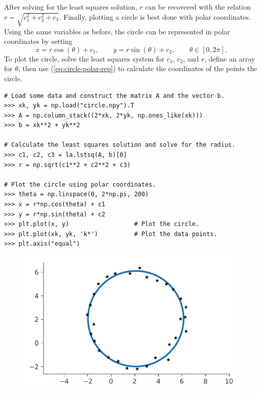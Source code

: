 After solving for the least squares solution, $r$ can be recovered with the relation $r = \sqrt{c_1^2 + c_2^2 + c_3}$.
Finally, plotting a circle is best done with polar coordinates.
Using the same variables as before, the circle can be represented in polar coordinates by setting
\begin{equation}
x = r\cos(\theta) + c_1, \qquad
y = r\sin(\theta) + c_2, \qquad
\theta\in [0,2\pi].
\label{eq:circle-polar-rep}
\end{equation}
To plot the circle, solve the least squares system for $c_1$, $c_2$, and $r$, define an array for $\theta$, then use (\ref{eq:circle-polar-rep}) to calculate the coordinates of the points the circle.

\begin{lstlisting}
# Load some data and construct the matrix A and the vector b.
>>> xk, yk = np.load("circle.npy").T
>>> A = np.column_stack((2*xk, 2*yk, np.ones_like(xk)))
>>> b = xk**2 + yk**2

# Calculate the least squares solution and solve for the radius.
>>> c1, c2, c3 = la.lstsq(A, b)[0]
>>> r = np.sqrt(c1**2 + c2**2 + c3)

# Plot the circle using polar coordinates.
>>> theta = np.linspace(0, 2*np.pi, 200)
>>> x = r*np.cos(theta) + c1
>>> y = r*np.sin(theta) + c2
>>> plt.plot(x, y)                  # Plot the circle.
>>> plt.plot(xk, yk, 'k*')          # Plot the data points.
>>> plt.axis("equal")
\end{lstlisting}

\begin{figure}[H]
    \includegraphics[width=.7\textwidth]{figures/circle_fit_example.pdf}
\end{figure}

